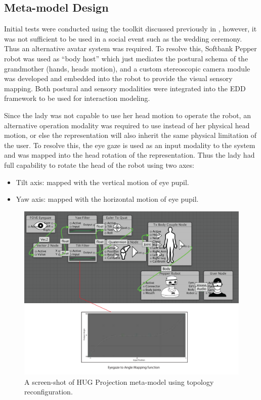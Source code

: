 \subsection{Meta-model Design}

Initial tests were conducted using the toolkit discussed previously in , however, it was not sufficient to be used in a social event such as the wedding ceremony. Thus an alternative avatar system was required. To resolve this, Softbank Pepper robot was used as ``body host'' which just mediates the postural schema of the grandmother (hands, heads motion), and a custom stereoscopic camera module was developed and embedded into the robot to provide the visual sensory mapping. Both postural and sensory modalities were integrated into the EDD framework to be used for interaction modeling. 

Since the lady was not capable to use her head motion to operate the robot, an alternative operation modality was required to use instead of her physical head motion, or else the representation will also inherit the same physical limitation of the user. To resolve this, the eye gaze is used as an input modality to the system and was mapped into the head rotation of the representation. Thus the lady had full capability to rotate the head of the robot using two axes: 
\begin{itemize}
    \item Tilt axis: mapped with the vertical motion of eye pupil.
    \item Yaw axis:  mapped with the horizontal motion of eye pupil.
\end{itemize}

\begin{figure}[t!]
  \centering
	  \includegraphics[width=1\linewidth]{figures/eval/HUG/Meta.pdf}
  \captionsetup{justification=centering}
  \caption{A screen-shot of HUG Projection meta-model using topology reconfiguration.}
  \label{fig:usability-hug-meta}
\end{figure}


